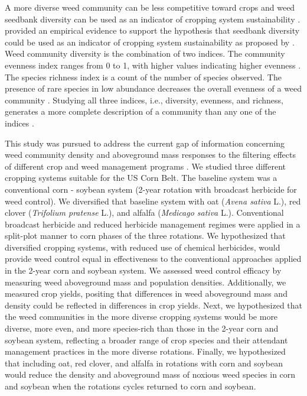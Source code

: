 \documentclass[
]{article}
\begin{document}
A more diverse weed community can be less competitive toward crops and weed seedbank diversity can be used as an indicator of cropping system sustainability \citep{storkeyWhatGoodWeed2018}. \citet{liebmanWeedSeedbankDiversity2021} provided an empirical evidence to support the hypothesis that seedbank diversity could be used as an indicator of cropping system sustainability as proposed by \citet{storkeyWhatGoodWeed2018}. Weed community diversity is the combination of two indices. The community evenness index ranges from 0 to 1, with higher values indicating higher evenness \citep{alataloProblemsMeasurementEvenness1981}. The species richness index is a count of the number of species observed. The presence of rare species in low abundance decreases the overall evenness of a weed community \citep{pielouInterpretationEcologicalData1984, stirlingEmpiricalRelationshipsSpecies2001}. Studying all three indices, i.e., diversity, evenness, and richness, generates a more complete description of a community than any one of the indices \citep{morrisChoosingUsingDiversity2014}.

This study was pursued to address the current gap of information concerning weed community density and aboveground mass responses to the filtering effects of different crop and weed management programs \citep{ryanManagementFiltersSpecies2010, friedTrajectoriesWeedCommunities2012}. We studied three different cropping systems suitable for the US Corn Belt. The baseline system was a conventional corn - soybean system (2-year rotation with broadcast herbicide for weed control). We diversified that baseline system with oat (\emph{Avena sativa} L.), red clover (\emph{Trifolium pratense} L.), and alfalfa (\emph{Medicago sativa} L.). Conventional broadcast herbicide and reduced herbicide management regimes were applied in a split-plot manner to corn phases of the three rotations. We hypothesized that diversified cropping systems, with reduced use of chemical herbicides, would provide weed control equal in effectiveness to the conventional approaches applied in the 2-year corn and soybean system. We assessed weed control efficacy by measuring weed aboveground mass and population densities. Additionally, we measured crop yields, positing that differences in weed aboveground mass and density could be reflected in differences in crop yields. Next, we hypothesized that the weed communities in the more diverse cropping systems would be more diverse, more even, and more species-rich than those in the 2-year corn and soybean system, reflecting a broader range of crop species and their attendant management practices in the more diverse rotations. Finally, we hypothesized that including oat, red clover, and alfalfa in rotations with corn and soybean would reduce the density and aboveground mass of noxious weed species in corn and soybean when the rotations cycles returned to corn and soybean.
\end{document}
